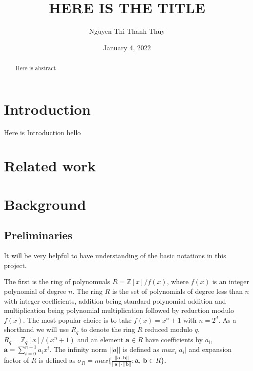 \documentclass[A4paper,12pt]{article}
\title{}
\author{}
\begin{document}
\newtheorem{definition}{Definition}[section]
\title{\textbf{HERE IS THE TITLE}}
\author{Nguyen Thi Thanh Thuy\\ }
\date{January 4, 2022}
\maketitle

\newpage
\tableofcontents
\newpage
\listoffigures

\newpage

\begin{abstract}
Here is abstract
\end{abstract}


\section{Introduction}
Here is Introduction
hello
\newpage
\section{Related work}

\section{Background}

\subsection{Preliminaries}

It will be very helpful to have understanding of the basic notations in this project.

The first is the ring of polynomuals $R = \mathbb{Z}[x]/f(x)$, where $f(x)$ is an integer polynomial of degree $n$. The ring $R$ is the set of polynomials of degree less than $n$ with integer coefficients, addition being standard polynomial addition and multiplication being polynomial multiplication followed by reduction modulo $f(x)$. The most popular choice is to take $f(x) = x^n + 1$ with $n = 2^d$. As a shorthand we will use $R_q$ to denote the ring $R$ reduced modulo $q$, $R_q = \mathbb{Z}_q[x]/(x^n + 1)$ and an element $\textbf{a} \in R$ have coefficients by $a_i$, $\textbf{a} = \sum_{i=0}^{n-1}a_ix^i$. The infinity norm $||a||$ is defined as $max_i|a_i|$ and expansion factor of $R$ is defined as $\sigma_R = max\{\frac{||\textbf{a} \cdot \textbf{b}||}{||\textbf{a}|| \cdot ||\textbf{b}||}: \textbf{a, b} \in R\}$.
\end{document}
